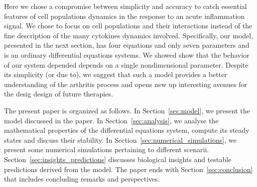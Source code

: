 \documentclass[a4paper, 12pt]{article}
\providecommand{\DIFaddtex}[1]{{\protect\color{blue} \sf #1}} %
\providecommand{\DIFdeltex}[1]{{\protect\color{red} \scriptsize #1}} %
\providecommand{\DIFaddbegin}{} %
\providecommand{\DIFaddend}{} %
\providecommand{\DIFdelbegin}{} %
\providecommand{\DIFdelend}{} %
\providecommand{\DIFadd}[1]{\texorpdfstring{\DIFaddtex{#1}}{#1}} %
\providecommand{\DIFdel}[1]{\texorpdfstring{\DIFdeltex{#1}}{}} %
\begin{document}
Here we chose a compromise between simplicity and accuracy   to catch essential features \DIFaddbegin \DIFadd{of cell populations dynamics in the response to an acute inflammation signal}\DIFaddend . We chose to focus on cell populations and their interactions instead of the fine description of the many cytokines dynamics involved.
 Specifically, our model, presented in the next section, has four equations and only seven parameters and is an ordinary differential equations systems. We \DIFdelbegin \DIFdel{showed }\DIFdelend \DIFaddbegin \DIFadd{show }\DIFaddend that the behavior of our system \DIFdelbegin \DIFdel{depended }\DIFdelend \DIFaddbegin \DIFadd{depends }\DIFaddend on a single nondimensional parameter.
Despite its simplicity (or due to), we suggest that such a model provides a better understanding of the arthritis process and opens \DIFdelbegin \DIFdel{new }\DIFdelend \DIFaddbegin \DIFadd{up interesting }\DIFaddend avenues for the \DIFdelbegin \DIFdel{desig }\DIFdelend \DIFaddbegin \DIFadd{design }\DIFaddend of future therapies.\par
The present paper is organized as follows.
In Section~\ref{sec:model}, we present the model\DIFdelbegin \DIFdel{discussed in the paper}\DIFdelend . In Section~\ref{sec:analysis}, we analyse the mathematical properties of the differential \DIFaddbegin \DIFadd{equations }\DIFaddend system, compute its steady states and discuss their stability. In Section~\ref{sec:numerical_simulations}, we present some numerical simulations pertaining to different scenarii.
Section~\ref{sec:insights_predictions} discusses biological insights and testable predictions derived from the model.
The paper ends with  Section~\ref{sec:conclusion} that includes concluding remarks and  perspectives.
\end{document}
